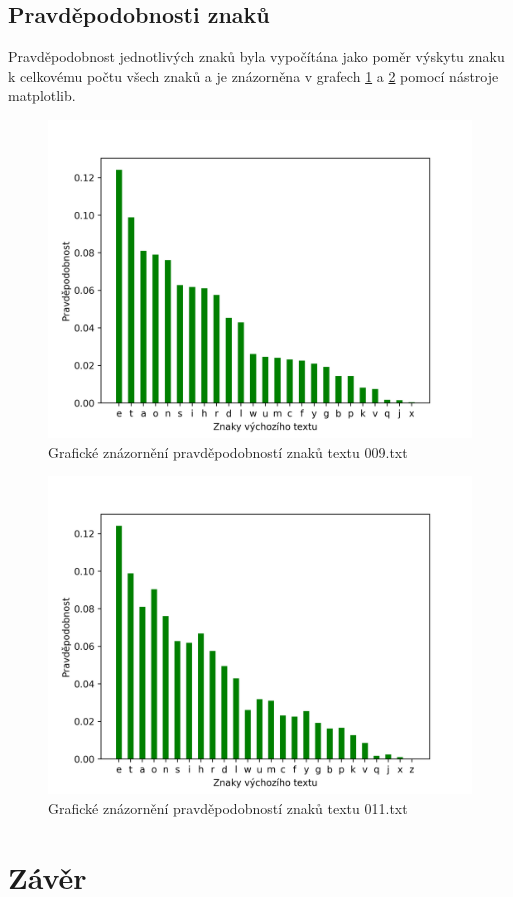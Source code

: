 \documentclass[12pt]{article}
\begin{document}
				\subsection{Pravděpodobnosti znaků}\label{pz}
			 Pravděpodobnost jednotlivých znaků byla vypočítána jako poměr výskytu znaku k celkovému počtu všech znaků a je znázorněna v grafech \ref{009_graph2} a \ref{011_graph2} pomocí nástroje matplotlib.
						
\begin{figure}[!htb]
\includegraphics[scale=0.8]{009_char_prob.png}\centering\caption{Grafické znázornění pravděpodobností znaků textu 009.txt}\label{009_graph2}
\end{figure}

\begin{figure}[!htb]
\includegraphics[scale=0.8]{011_char_prob.png}\centering\caption{Grafické znázornění pravděpodobností znaků textu 011.txt}\label{011_graph2}
\end{figure}
	
			
   	\section{Závěr}\label{z}
   		
\end{document}

